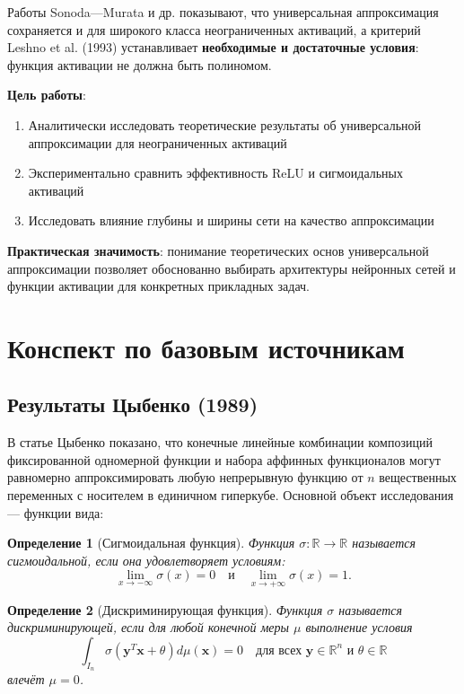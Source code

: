 \documentclass[12pt]{article}
\newtheorem{definition}{Определение}
\begin{document}
	Работы Sonoda---Murata и др. показывают, что универсальная аппроксимация сохраняется и для широкого класса неограниченных активаций, а критерий Leshno et al. (1993) устанавливает \textbf{необходимые и достаточные условия}: функция активации не должна быть полиномом.
	
	\textbf{Цель работы}: 
	\begin{enumerate}
		\item Аналитически исследовать теоретические результаты об универсальной аппроксимации для неограниченных активаций
		\item Экспериментально сравнить эффективность ReLU и сигмоидальных активаций
		\item Исследовать влияние глубины и ширины сети на качество аппроксимации
	\end{enumerate}
	
	\textbf{Практическая значимость}: понимание теоретических основ универсальной аппроксимации позволяет обоснованно выбирать архитектуры нейронных сетей и функции активации для конкретных прикладных задач.
	
	\section{Конспект по базовым источникам}
	
	\subsection{Результаты Цыбенко (1989)}
	
	В статье Цыбенко показано, что конечные линейные комбинации композиций фиксированной одномерной функции и набора аффинных функционалов могут равномерно аппроксимировать любую непрерывную функцию от $n$ вещественных переменных с носителем в единичном гиперкубе. Основной объект исследования — функции вида:
	
	\begin{definition}[Сигмоидальная функция]
		Функция $\sigma: \mathbb{R} \to \mathbb{R}$ называется сигмоидальной, если она удовлетворяет условиям:
		\[
		\lim_{x \to -\infty} \sigma(x) = 0 \quad \text{и} \quad \lim_{x \to +\infty} \sigma(x) = 1.
		\]
	\end{definition}
	
	\begin{definition}[Дискриминирующая функция]
		Функция $\sigma$ называется дискриминирующей, если для любой конечной меры $\mu$ выполнение условия
		\[
		\int_{I_n} \sigma(\mathbf{y}^T\mathbf{x} + \theta) d\mu(\mathbf{x}) = 0 \quad \text{для всех } \mathbf{y} \in \mathbb{R}^n \text{ и } \theta \in \mathbb{R}
		\]
		влечёт $\mu = 0$.
	\end{definition}
	
\end{document}
